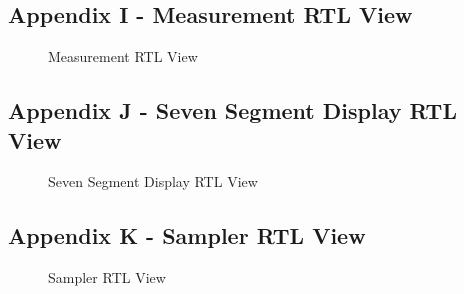 \documentclass[a4paper,12pt]{article}
\begin{document}
\subsection{Appendix I - Measurement RTL View}
\begin{figure}[H]
	\centering
	\caption{Measurement RTL View}
\end{figure}
\newpage
\subsection{Appendix J - Seven Segment Display RTL View}
\begin{figure}[H]
	\centering
	\caption{Seven Segment Display RTL View}
\end{figure}
\newpage
\subsection{Appendix K - Sampler RTL View}
\begin{figure}[H]
	\centering
	\caption{Sampler RTL View}
\end{figure}
\newpage
{}
\begin{flushleft}

\end{flushleft}
\end{document}
